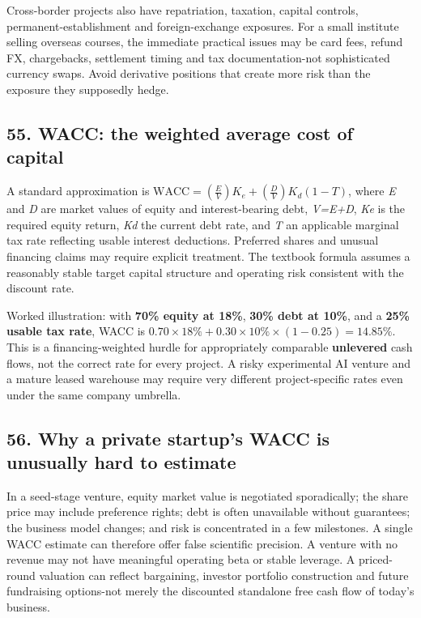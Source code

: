 Cross-border projects also have repatriation, taxation, capital controls, permanent-establishment and foreign-exchange exposures. For a small institute selling overseas courses, the immediate practical issues may be card fees, refund FX, chargebacks, settlement timing and tax documentation-not sophisticated currency swaps. Avoid derivative positions that create more risk than the exposure they supposedly hedge.

\subsection{55. WACC: the weighted average cost of capital}


A standard approximation is $\mathrm{WACC} = \left(\frac{E}{V}\right) K_e + \left(\frac{D}{V}\right) K_d (1 - T)$, where \textit{E} and \textit{D} are market values of equity and interest-bearing debt, \textit{V=E+D}, \textit{Ke} is the required equity return, \textit{Kd} the current debt rate, and \textit{T} an applicable marginal tax rate reflecting usable interest deductions. Preferred shares and unusual financing claims may require explicit treatment. The textbook formula assumes a reasonably stable target capital structure and operating risk consistent with the discount rate.

Worked illustration: with \textbf{70\% equity at 18\%}, \textbf{30\% debt at 10\%}, and a \textbf{25\% usable tax rate}, WACC is $0.70 \times 18\% + 0.30 \times 10\% \times (1 - 0.25) = 14.85\%$. This is a financing-weighted hurdle for appropriately comparable \textbf{unlevered} cash flows, not the correct rate for every project. A risky experimental AI venture and a mature leased warehouse may require very different project-specific rates even under the same company umbrella.

\subsection{56. Why a private startup's WACC is unusually hard to estimate}


In a seed-stage venture, equity market value is negotiated sporadically; the share price may include preference rights; debt is often unavailable without guarantees; the business model changes; and risk is concentrated in a few milestones. A single WACC estimate can therefore offer false scientific precision. A venture with no revenue may not have meaningful operating beta or stable leverage. A priced-round valuation can reflect bargaining, investor portfolio construction and future fundraising options-not merely the discounted standalone free cash flow of today's business.

